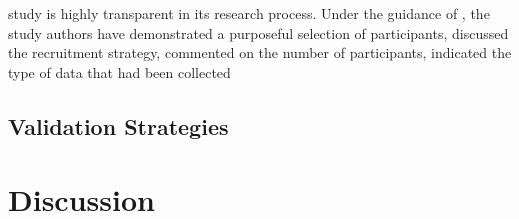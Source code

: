 \documentclass[
        a4paper, %
        12pt, %
        stu, %
        donotrepeattitle, %
        floatsintext, %
        biblatex, %
        twoside, %
        colorlinks=true,        %
        linkcolor=red,          %
        anchorcolor=red,      %
        citecolor=blue,         %
        urlcolor=blue,          %
        bookmarks=true,         %
        bookmarksopen=false,    %
        bookmarksnumbered=true,  %
        dvipsnames
]{apa7}
\begin{document}
 study is highly transparent in its research process. Under the guidance of \textcite[][pp. 185--187]{creswell:2018}, the study authors have demonstrated a purposeful selection of participants, discussed the recruitment strategy, commented on the number of participants, indicated the type of data that had been collected

\subsection{Validation Strategies} %

\section{Discussion} %

\printbibliography
\end{document}
